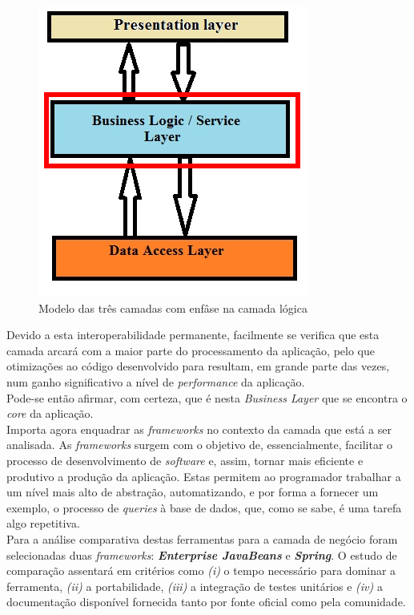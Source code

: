 \begin{figure}[!h]
\centering
\includegraphics[scale=.4]{img/camada-logica}
\caption{Modelo das três camadas com enfâse na camada lógica}
\end{figure}

Devido a esta interoperabilidade permanente, facilmente se verifica que esta camada arcará com a maior parte do processamento da aplicação, pelo que otimizações ao código desenvolvido para resultam, em grande parte das vezes, num ganho significativo a nível de \textit{performance} da aplicação.\\

Pode-se então afirmar, com certeza, que é nesta \textit{Business Layer} que se encontra o \textit{core} da aplicação.\\

Importa agora enquadrar as \textit{frameworks} no contexto da camada que está a ser analisada.
As \textit{frameworks} surgem com o objetivo de, essencialmente, facilitar o processo de desenvolvimento de \textit{software} e, assim, tornar mais eficiente e produtivo a produção da aplicação.
Estas permitem ao programador trabalhar a um nível mais alto de abstração, automatizando, e por forma a fornecer um exemplo, o processo de \textit{queries} à base de dados, que, como se sabe, é uma tarefa algo repetitiva.\\

Para a análise comparativa destas ferramentas para a camada de negócio foram selecionadas duas \textit{frameworks}: \textit{\textbf{Enterprise JavaBeans}} e \textit{\textbf{Spring}}.
O estudo de comparação assentará em critérios como \textit{(i)} o tempo necessário para dominar a ferramenta, \textit{(ii)} a portabilidade, \textit{(iii)} a integração de testes unitários e \textit{(iv)} a documentação disponível fornecida tanto por fonte oficial como pela comunidade.

